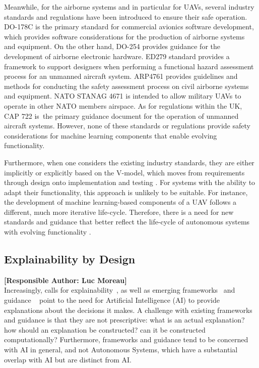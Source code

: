 \documentclass[sigconf]{acmart}
\begin{document}
Meanwhile, for the airborne systems and in particular for UAVs, several industry standards and regulations have been introduced to ensure their safe operation. 
DO-178C \cite{DO-178C} is the primary standard for commercial avionics software development, which provides software considerations for the production of airborne systems and equipment. On the other hand, DO-254 \cite{DO-254} provides guidance for the development of airborne electronic hardware. ED279 \cite{ED279} standard provides a framework to support designers when performing a functional hazard assessment process for an unmanned aircraft system. 
ARP4761 \cite{ARP4761} provides guidelines and methods for conducting the safety assessment process on civil airborne systems and equipment. 
NATO STANAG 4671 \cite{STANAG4761} is intended to allow military UAVs to operate in other NATO members airspace. 
As for regulations within the UK, CAP 722 \cite{CAP722} is the primary guidance document for the operation of unmanned aircraft systems. 
However, none of these standards or regulations provide safety considerations for machine learning components that enable evolving functionality.

Furthermore, when one considers the existing industry standards, they are either implicitly or explicitly based on the V-model, which moves from requirements through design onto implementation and testing \cite{Jia2021}. 
For systems with the ability to adapt their functionality, this approach is unlikely to be suitable. 
For instance, the development of machine learning-based components of a UAV follows a different, much more iterative life-cycle. Therefore, there is a need for new standards and guidance that better reflect the life-cycle of autonomous systems with evolving functionality \cite{Hawkins2021}.
\subsection{Explainability by Design} %
\noindent\textbf{[Responsible Author:  Luc Moreau]}\\



Increasingly, calls for explainability~\cite{Hamon:2020,gchq:2021}, as well as  emerging frameworks~\cite{Hamon:2020} and guidance ~\cite{ico:2020}  point to the need for Artificial Intelligence (AI) to provide explanations about the decisions it makes.  A challenge with existing frameworks and guidance is that they are not prescriptive: what is an actual explanation?   how   should an explanation be constructed? can it be constructed  computationally?  Furthermore,  frameworks and guidance tend to be concerned with AI in general, and not Autonomous Systems, which have a substantial overlap with AI but are distinct from AI.
\end{document}
